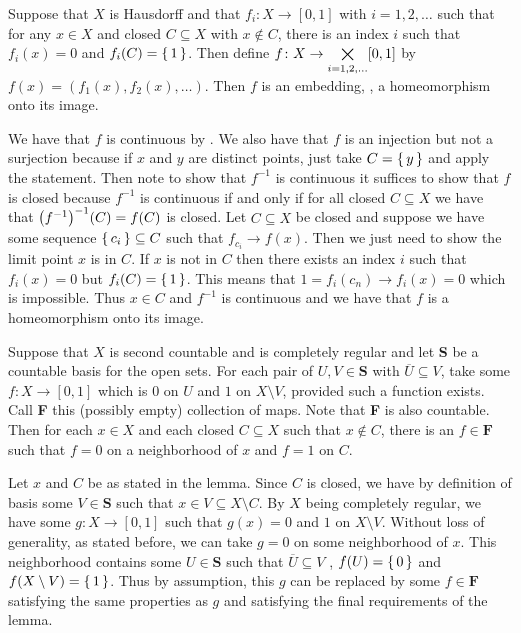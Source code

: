 \documentclass[letterpaper, 11pt, oneside]{book}
\begin{document}
\begin{lem}\label{lem: Hausdorff_and_comp_reg-ish_embedding}
  Suppose that $X$ is Hausdorff and that $f_{i}\colon X \to [0, 1]$ with $i = 1, 2, \ldots$ such that for any $x \in X$ and closed $C \subseteq X$ with $x \notin C$, there is an index $i$ such that $f_{i}(x) = 0$ and $f_{i}(C) = \set{1}$.
  Then define $f\colon X \to \bigtimes\limits_{i = 1, 2, \ldots} [0, 1]$ by $f(x) = (f_{1}(x), f_{2}(x), \ldots)$.
  Then $f$ is an embedding, \ie, a homeomorphism onto its image.
\end{lem}
\begin{pf}
  We have that $f$ is continuous by .
  We also have that $f$ is an injection but not a surjection because if $x$ and $y$ are distinct points, just take $C = \set{y}$ and apply the statement.
  Then note to show that $f^{-1}$ is continuous it suffices to show that $f$ is closed because $f^{-1}$ is continuous if and only if for all closed $C \subseteq X$ we have that $\pqty{f^{-1}}^{-1}(C) = f(C)$ is closed.
  Let $C \subseteq X$ be closed and suppose we have some sequence $\set{c_{i}} \subseteq C$ such that $f_{c_{i}} \to f(x)$.
  Then we just need to show the limit point $x$ is in $C$.
  If $x$ is not in $C$ then there exists an index $i$ such that $f_{i}(x) = 0$ but $f_{i}(C) = \set{1}$.
  This means that $1 = f_{i}(c_{n}) \to f_{i}(x) = 0$ which is impossible.
  Thus $x \in C$ and $f^{-1}$ is continuous and we have that $f$ is a homeomorphism onto its image.
\end{pf}

\begin{lem}\label{lem: second_count_comp_reg_family_F}
  Suppose that $X$ is second countable and is completely regular and let \textbf{S} be a countable basis for the open sets.
  For each pair of $U, V \in \textbf{S}$ with $\overline{U} \subseteq V$, take some $f\colon X \to [0, 1]$ which is $0$ on $U$ and $1$ on $X \setminus V$, provided such a function exists.
  Call \textbf{F} this (possibly empty) collection of maps.
  Note that \textbf{F} is also countable.
  Then for each $x \in X$ and each closed $C \subseteq X$ such that $x \notin C$, there is an $f \in \textbf{F}$ such that $f = 0$ on a neighborhood of $x$ and $f = 1$ on $C$.
\end{lem}
\begin{pf}
  Let $x$ and $C$ be as stated in the lemma.
  Since $C$ is closed, we have by definition of basis some $V \in \textbf{S}$ such that $x \in V \subseteq X \setminus C$.
  By $X$ being completely regular, we have some $g\colon X \to [0, 1]$ such that $g(x) = 0$ and $1$ on $X \setminus V$.
  Without loss of generality, as stated before, we can take $g = 0$ on some neighborhood of $x$.
  This neighborhood contains some $U \in \textbf{S}$ such that $\overline{U} \subseteq V$ , $f(U) = \set{0}$ and $f(X \setminus V) = \set{1}$.
  Thus by assumption, this $g$ can be replaced by some $f \in \textbf{F}$ satisfying the same properties as $g$ and satisfying the final requirements of the lemma.
\end{pf}
\end{document}
